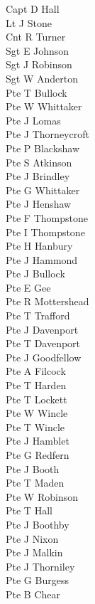 \begin{multicols}{2}
  \noindent
  Capt D Hall \\
  Lt J Stone \\
  Cnt R Turner \\
  Sgt E Johnson \\
  Sgt J Robinson \\
  Sgt W Anderton \\
  Pte T Bullock \\
  Pte W Whittaker \\
  Pte J Lomas \\
  Pte J Thorneycroft \\
  Pte P Blackshaw \\
  Pte S Atkinson \\
  Pte J Brindley \\
  Pte G Whittaker \\
  Pte J Henshaw \\
  Pte F Thompstone \\
  Pte I Thompstone \\
  Pte H Hanbury \\
  Pte J Hammond \\
  Pte J Bullock \\
  Pte E Gee \\
  Pte R Mottershead \\
  Pte T Trafford \\
  Pte J Davenport \\
  Pte T Davenport \\
  Pte J Goodfellow \\
  Pte A Filcock \\
  Pte T Harden \\
  Pte T Lockett \\
  Pte W Wincle \\
  Pte T Wincle \\
  Pte J Hamblet \\
  Pte G Redfern \\
  Pte J Booth \\
  Pte T Maden \\
  Pte W Robinson \\
  Pte T Hall \\
  Pte J Boothby \\
  Pte J Nixon \\
  Pte J Malkin \\
  Pte J Thorniley \\
  Pte G Burgess \\
  Pte B Chear \\

\end{multicols}
